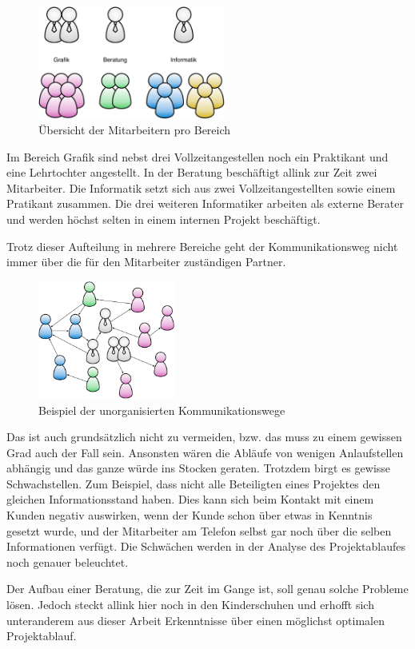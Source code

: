 \begin{figure}[htbp]
\begin{center}
\includegraphics[width=0.55\textwidth,angle=0]{./bilder/analyse/mitarbeiter_pro_bereich.pdf}
\caption{Übersicht der Mitarbeitern pro Bereich}
\label{pic:mitarbeiter_pro_bereich}
\end{center}
\end{figure}

Im Bereich Grafik sind nebst drei Vollzeitangestellen noch ein Praktikant und eine
Lehrtochter angestellt. In der Beratung beschäftigt allink zur Zeit zwei Mitarbeiter.
Die Informatik setzt sich aus zwei Vollzeitangestellten sowie einem Pratikant
zusammen. Die drei weiteren Informatiker arbeiten als externe Berater und
werden höchst selten in einem internen Projekt beschäftigt.

Trotz dieser Aufteilung in mehrere Bereiche geht der Kommunikationsweg nicht
immer über die für den Mitarbeiter zuständigen Partner. 

\begin{figure}[htbp]
\begin{center}
\includegraphics[width=0.40\textwidth,angle=0]{./bilder/analyse/kommunikationswege.pdf}
\caption{Beispiel der unorganisierten Kommunikationswege}
\label{pic:kommunikationswege}
\end{center}
\end{figure}

Das ist auch grundsätzlich nicht zu vermeiden, bzw. das muss zu einem gewissen
Grad auch der Fall sein. Ansonsten wären die Abläufe von wenigen Anlaufstellen abhängig
und das ganze würde ins Stocken geraten. Trotzdem birgt es gewisse Schwachstellen.
Zum Beispiel, dass nicht alle Beteiligten eines Projektes den gleichen Informationsstand 
haben. Dies kann sich beim Kontakt mit einem Kunden negativ auswirken, wenn der
Kunde schon über etwas in Kenntnis gesetzt wurde, und der Mitarbeiter am
Telefon selbst gar noch über die selben Informationen verfügt. Die Schwächen 
werden in der Analyse des Projektablaufes noch genauer beleuchtet.

Der Aufbau einer Beratung, die zur Zeit im Gange ist, soll genau solche Probleme
lösen. Jedoch steckt allink hier noch in den Kinderschuhen und erhofft sich
unteranderem aus dieser Arbeit Erkenntnisse über einen möglichst optimalen 
Projektablauf.
